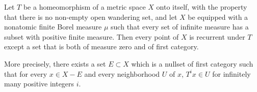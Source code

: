 Let $T$ be a homeomorphism of a metric space $X$ onto itself, with the property that there is no non-empty open wandering set, and let $X$ be equipped with a nonatomic finite Borel measure $\mu$ such that every set of infinite measure has a subset with positive finite measure. Then every point of $X$ is recurrent under $T$ except a set that is both of measure zero and of first category.

More precisely, there exists a set $E \subset X$ which is a nullset of first category such that for every $x \in X - E$ and every neighborhood $U$ of $x$, $T^i x \in U$ for infinitely many positive integers $i$.
